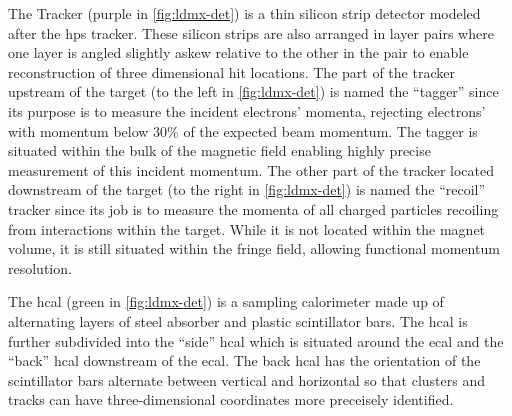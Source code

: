 The Tracker (purple in \cref{fig:ldmx-det}) is a thin silicon strip detector modeled after the
\ac{hps} tracker. These silicon strips are also arranged in layer pairs where one layer is angled
slightly askew relative to the other in the pair to enable reconstruction of three dimensional hit
locations. The part of the tracker upstream of the target (to the left in \cref{fig:ldmx-det}) is
named the ``tagger'' since its purpose is to measure the incident electrons' momenta, rejecting
electrons' with momentum below $30\%$ of the expected beam momentum. The tagger is situated within
the bulk of the magnetic field enabling highly precise measurement of this incident momentum. The
other part of the tracker located downstream of the target (to the right in \cref{fig:ldmx-det}) is
named the ``recoil'' tracker since its job is to measure the momenta of all charged particles
recoiling from interactions within the target. While it is not located within the magnet volume, it
is still situated within the fringe field, allowing functional momentum resolution.

The \ac{hcal} (green in \cref{fig:ldmx-det}) is a sampling calorimeter made up of alternating
layers of steel absorber and plastic scintillator bars. The \ac{hcal} is further subdivided into
the ``side'' \ac{hcal} which is situated around the \ac{ecal} and the ``back'' \ac{hcal}
downstream of the \ac{ecal}. The back \ac{hcal} has the orientation of the scintillator bars
alternate between vertical and horizontal so that clusters and tracks can have three-dimensional
coordinates more preceisely identified.

